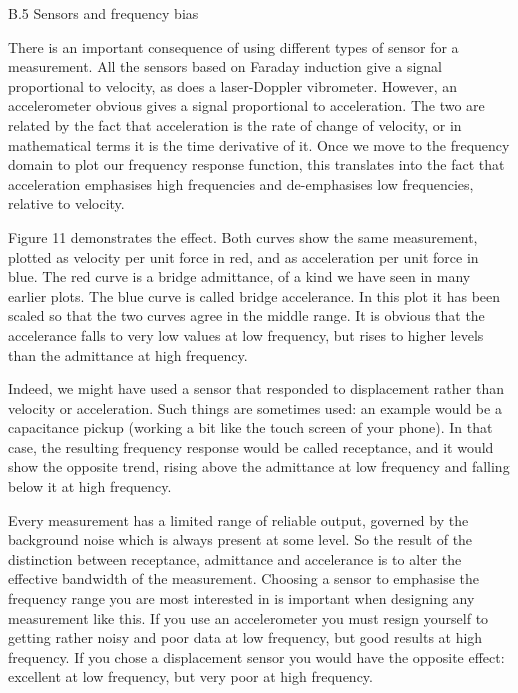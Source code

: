   B.5 Sensors and frequency bias 

  There is an important consequence of using different types of sensor for a 
  measurement. All the sensors based on Faraday induction give a signal 
  proportional to velocity, as does a laser-Doppler vibrometer. However, an 
  accelerometer obvious gives a signal proportional to acceleration. The two 
  are related by the fact that acceleration is the rate of change of velocity, 
  or in mathematical terms it is the time derivative of it. Once we move to the 
  frequency domain to plot our frequency response function, this translates 
  into the fact that acceleration emphasises high frequencies and de-emphasises 
  low frequencies, relative to velocity. 

  Figure 11 demonstrates the effect. Both curves show the same measurement, 
  plotted as velocity per unit force in red, and as acceleration per unit force 
  in blue. The red curve is a bridge admittance, of a kind we have seen in many 
  earlier plots. The blue curve is called bridge accelerance. In this plot it 
  has been scaled so that the two curves agree in the middle range. It is 
  obvious that the accelerance falls to very low values at low frequency, but 
  rises to higher levels than the admittance at high frequency. 

  Indeed, we might have used a sensor that responded to displacement rather 
  than velocity or acceleration. Such things are sometimes used: an example 
  would be a capacitance pickup (working a bit like the touch screen of your 
  phone). In that case, the resulting frequency response would be called 
  receptance, and it would show the opposite trend, rising above the admittance 
  at low frequency and falling below it at high frequency. 

  Every measurement has a limited range of reliable output, governed by the 
  background noise which is always present at some level. So the result of the 
  distinction between receptance, admittance and accelerance is to alter the 
  effective bandwidth of the measurement. Choosing a sensor to emphasise the 
  frequency range you are most interested in is important when designing any 
  measurement like this. If you use an accelerometer you must resign yourself 
  to getting rather noisy and poor data at low frequency, but good results at 
  high frequency. If you chose a displacement sensor you would have the 
  opposite effect: excellent at low frequency, but very poor at high frequency. 


